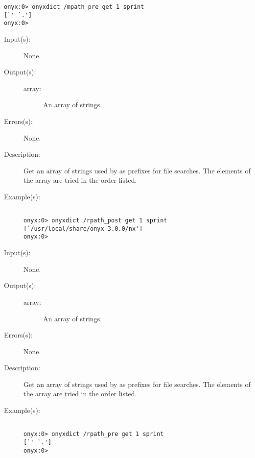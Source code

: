 \begin{description}
\begin{description}
\begin{verbatim}
onyx:0> onyxdict /mpath_pre get 1 sprint
[`' `.']
onyx:0>
		\end{verbatim}
	\end{description}
\label{onyxdict:rpath_post}
\item[{\onyxop{--}{rpath\_post}{array}}: ]
	\begin{description}\item[]
	\item[Input(s): ] None.
	\item[Output(s): ]
		\begin{description}\item[]
		\item[array: ]
			An array of strings.
		\end{description}
	\item[Errors(s): ] None.
	\item[Description: ]
		Get an array of strings used by
		 as prefixes for file
		searches.  The elements of the array are tried in the order
		listed.
	\item[Example(s): ]\begin{verbatim}

onyx:0> onyxdict /rpath_post get 1 sprint
[`/usr/local/share/onyx-3.0.0/nx']
onyx:0>
		\end{verbatim}
	\end{description}
\label{onyxdict:rpath_pre}
\item[{\onyxop{--}{rpath\_pre}{array}}: ]
	\begin{description}\item[]
	\item[Input(s): ] None.
	\item[Output(s): ]
		\begin{description}\item[]
		\item[array: ]
			An array of strings.
		\end{description}
	\item[Errors(s): ] None.
	\item[Description: ]
		Get an array of strings used by
		 as prefixes for file
		searches.  The elements of the array are tried in the order
		listed.
	\item[Example(s): ]\begin{verbatim}

onyx:0> onyxdict /rpath_pre get 1 sprint
[`' `.']
onyx:0>
		\end{verbatim}
	\end{description}
\end{description}

